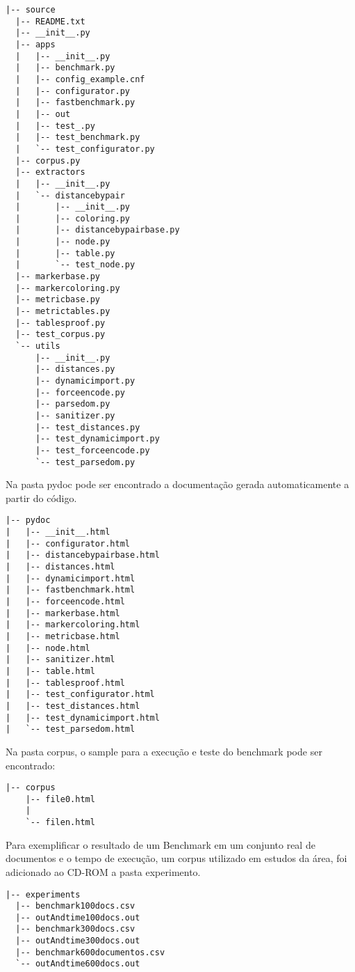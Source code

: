 \documentclass{acm_proc_article-sp}
\numberwithin{equation}{section}
\begin{document}
\begin{verbatim}
|-- source
  |-- README.txt 
  |-- __init__.py
  |-- apps
  |   |-- __init__.py
  |   |-- benchmark.py
  |   |-- config_example.cnf
  |   |-- configurator.py
  |   |-- fastbenchmark.py
  |   |-- out
  |   |-- test_.py
  |   |-- test_benchmark.py
  |   `-- test_configurator.py
  |-- corpus.py
  |-- extractors
  |   |-- __init__.py
  |   `-- distancebypair
  |       |-- __init__.py
  |       |-- coloring.py
  |       |-- distancebypairbase.py
  |       |-- node.py
  |       |-- table.py
  |       `-- test_node.py
  |-- markerbase.py
  |-- markercoloring.py
  |-- metricbase.py
  |-- metrictables.py
  |-- tablesproof.py
  |-- test_corpus.py
  `-- utils
      |-- __init__.py
      |-- distances.py
      |-- dynamicimport.py
      |-- forceencode.py
      |-- parsedom.py
      |-- sanitizer.py
      |-- test_distances.py
      |-- test_dynamicimport.py
      |-- test_forceencode.py
      `-- test_parsedom.py
\end{verbatim}
Na pasta pydoc pode ser encontrado a documentação gerada automaticamente
a partir do código.

\begin{verbatim}
|-- pydoc
|   |-- __init__.html
|   |-- configurator.html
|   |-- distancebypairbase.html
|   |-- distances.html
|   |-- dynamicimport.html
|   |-- fastbenchmark.html
|   |-- forceencode.html
|   |-- markerbase.html
|   |-- markercoloring.html
|   |-- metricbase.html
|   |-- node.html
|   |-- sanitizer.html
|   |-- table.html
|   |-- tablesproof.html
|   |-- test_configurator.html
|   |-- test_distances.html
|   |-- test_dynamicimport.html
|   `-- test_parsedom.html
\end{verbatim}

Na pasta corpus, o sample para a execução e teste do benchmark pode ser
encontrado:

\begin{verbatim}
|-- corpus
    |-- file0.html 
    |
    `-- filen.html
\end{verbatim}

Para exemplificar o resultado de um Benchmark em um conjunto real de
documentos e o tempo de execução, um corpus utilizado em estudos da área,
foi adicionado ao CD-ROM a pasta experimento.

\begin{verbatim}
|-- experiments
  |-- benchmark100docs.csv
  |-- outAndtime100docs.out
  |-- benchmark300docs.csv
  |-- outAndtime300docs.out
  |-- benchmark600documentos.csv
  `-- outAndtime600docs.out
\end{verbatim}




\end{document}

